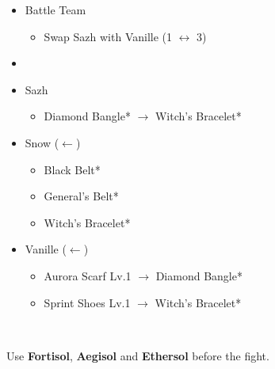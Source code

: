 \begin{menu}
	\begin{itemize}
	\paradigm
		\begin{itemize}
			\item Battle Team
				\begin{itemize}
					\item Swap Sazh with Vanille (1 $\leftrightarrow$ 3)
				\end{itemize}
			\item {}%
				{\paradigmline{\com}{\com}{\com}}%
				{\paradigmline{(\sab)}{(\sen)}{\rav}}%
				{\paradigmline{(\rav)}{\com}{(\rav)}}%
				{\paradigmline[4]{(\sab)}{\sen}{(\rav)}}%
				{\paradigmline{\med}{(\syn)}{\syn}}%
				{\paradigmline{(\sen)}{(\sen)}{(\sen)}}%
		\end{itemize}
	\equip
		\begin{itemize}
			\item Sazh
				\begin{itemize}
					\item Diamond Bangle* $\rightarrow$ Witch's Bracelet*
				\end{itemize}
			\item Snow ($\leftarrow$)
				\begin{itemize}
					\item Black Belt*
					\item General's Belt*
					\item Witch's Bracelet*
				\end{itemize}
			\item Vanille ($\leftarrow$)
				\begin{itemize}
					\item Aurora Scarf Lv.1 $\rightarrow$ Diamond Bangle*
					\item Sprint Shoes Lv.1 $\rightarrow$ Witch's Bracelet*
				\end{itemize}
		\end{itemize}
	\end{itemize}
\end{menu}

\renewcommand{\first}{[1] Cerberus (\com/\com/\com)}
\renewcommand{\second}{[2] Matador (\sab/\sen/\rav)}
\renewcommand{\third}{[3] Relentless Assault (\rav/\com/\rav)}
\renewcommand{\fourth}{[4] Matador (\sab/\sen/\rav)}
\renewcommand{\fifth}{[5] Recuperation (\med/\syn/\syn)}
\renewcommand{\sixth}{[6] Tortoise (\sen/\sen/\sen)}
\vfill
\ 
\columnbreak

Use \textbf{Fortisol}, \textbf{Aegisol} and \textbf{Ethersol} before the fight.

